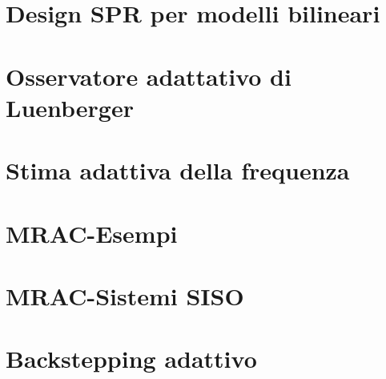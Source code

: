 \documentclass{book}
\begin{document}
\section{Design SPR per modelli bilineari}
\section{Osservatore adattativo di Luenberger}
\section{Stima adattiva della frequenza}
\section{MRAC-Esempi}
\section{MRAC-Sistemi SISO}
\section{Backstepping adattivo}
\end{document}
